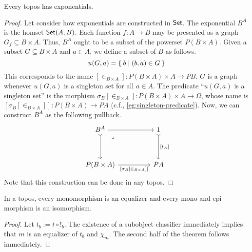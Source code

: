 \documentclass[article,10pt,oneside]{memoir}
\begin{document}
\begin{thm}\label{thm:topos-has-exponentials}
  Every topos has exponentials.
\end{thm}
\begin{proof}
  Let consider how exponentials are constructed in $\mathsf{Set}$.
  The exponential $B^{A}$ is the homset $\mathsf{Set}(A, B)$.
  Each function $f : A \to B$ may be presented as a graph $G_{f} \subseteq B \times A$.
  Thus, $B^{A}$ ought to be a subset of the powerset $P(B \times A)$.
  Given a subset $G \subseteq B \times A$ and $a \in A$, we define a subset of $B$ as follows.
  \[
    u(G, a) = \Set{b \mid (b, a) \in G}
  \]
  This corresponds to the name $[\in_{B \times A}] : P(B \times A) \times A \to PB$.
  $G$ is a graph whenever $u(G,a)$ is a singleton set for all $a \in A$.
  The predicate ``$u(G,a)$ is a singleton set'' is the morphism $\sigma_{B}[\in_{B \times A}] : P(B \times A) \times A \to \Omega$, whose name is $[\sigma_{B}[\in_{B \times A}]] : P(B \times A) \to PA$ (c.f., \cref{eg:singleton-predicate}).
  Now, we can construct $B^{A}$ as the following pullback.
  \[\begin{tikzcd}
      {B^{A}} && 1 \\
      \\
      {P(B \times A)} && PA
      \arrow[tail, from=1-1, to=3-1]
      \arrow["{[\sigma_{B}[\in_{B \times A}]]}"', from=3-1, to=3-3]
      \arrow["{[t_{A}]}", tail, from=1-3, to=3-3]
      \arrow[from=1-1, to=1-3]
      \arrow["\lrcorner"{anchor=center, pos=0.125}, draw=none, from=1-1, to=3-3]
    \end{tikzcd}\]
  Note that this construction can be done in any topos.
\end{proof}

\begin{thm}
  In a topos, every monomorphism is an equalizer and every mono and epi morphism is an isomorphism.
\end{thm}
\begin{proof}
  Let $t_{b} := t \circ !_{b}$.
  The existence of a subobject classifier immediately implies that $m$ is an equalizer of $t_{b}$ and $\chi_{m}$.
  The second half of the theorem follows immediately.
\end{proof}
\end{document}
